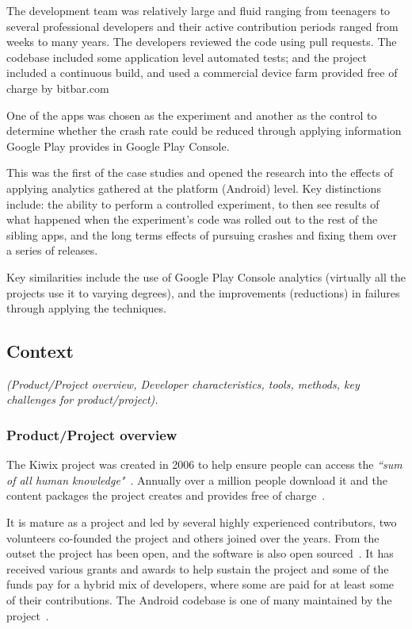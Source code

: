 The development team was relatively large and fluid ranging from teenagers to several professional developers and their active contribution periods ranged from weeks to many years. The developers reviewed the code using pull requests.  The codebase included some application level automated tests; and the project included a continuous build, and used a commercial device farm provided free of charge by bitbar.com 

One of the apps was chosen as the experiment and another as the control to determine whether the crash rate could be reduced through applying information Google Play provides in Google Play Console.

This was the first of the case studies and opened the research into the effects of applying analytics gathered at the platform (Android) level. Key distinctions include: the ability to perform a controlled experiment, to then see results of what happened when the experiment’s code was rolled out to the rest of the sibling apps, and the long terms effects of pursuing crashes and fixing them over a series of releases.

Key similarities include the use of Google Play Console analytics (virtually all the projects use it to varying degrees), and the improvements (reductions) in failures through applying the techniques. 

\subsection{Context}
\textit{(Product/Project overview, Developer characteristics, tools, methods, key challenges for product/project).}

\subsubsection{Product/Project overview}
The Kiwix project was created in 2006 to help ensure people can access the \emph{``sum of all human knowledge"}~\citep{coillet2016-wikimedia-kiwix-ten-years}. Annually over a million people download it and the content packages the project creates and provides free of charge~\citep{coillet2016-wikimedia-kiwix-ten-years}.

It is mature as a project and led by several highly experienced contributors, two volunteers co-founded the project and others joined over the years. From the outset the project has been open, and the software is also open sourced~\citep{sutherland2014_wikimedia_on_kelson}. It has received various grants and awards to help sustain the project and some of the funds pay for a hybrid mix of developers, where some are paid for at least some of their contributions. The Android codebase is one of many maintained by the project~\citep{gaudin2017_wikimedia_kiwix_android}. 


